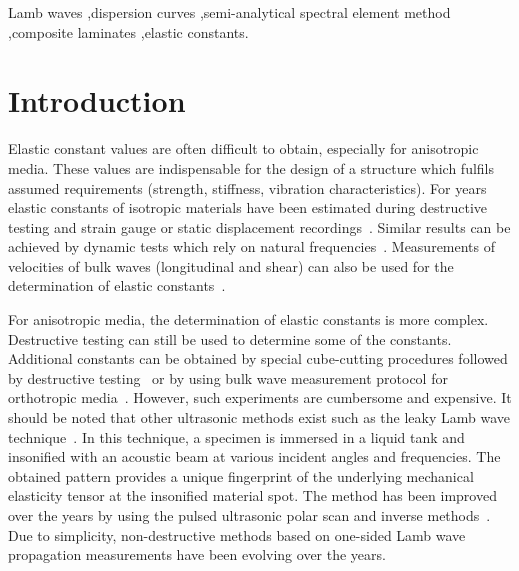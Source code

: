 \begin{frontmatter}
		\begin{keyword}
			Lamb waves \sep dispersion curves \sep semi-analytical spectral element method \sep composite laminates \sep elastic constants.
			
			
		\end{keyword}
		
	\end{frontmatter}
	
	
	
	
	
	
\section{Introduction}
	
	Elastic constant values are often difficult to obtain, especially for anisotropic media. These values are indispensable for the design of a structure which fulfils assumed requirements (strength, stiffness, vibration characteristics). For years elastic constants of isotropic materials have been estimated during destructive testing and strain gauge or static displacement recordings~\cite{Wang2000}. Similar results can be achieved by dynamic tests which rely on natural frequencies~\cite{Wang2000a, Wesolowski2009,Beluch2014}. Measurements of velocities of bulk waves (longitudinal and shear) can also be used for the determination of elastic constants~\cite{Rose1999}.
	
	For anisotropic media, the determination of elastic constants is more complex. Destructive testing can still be used to determine some of the constants. Additional constants can be obtained by special cube-cutting procedures followed by destructive testing~\cite{Rose1991} or by using bulk wave measurement protocol for orthotropic media~\cite{Rose1999}. However, such experiments are cumbersome and expensive.  It should be noted that other ultrasonic methods exist such as the leaky Lamb wave technique~\cite{Karim1990,Karim1990a}. In this technique, a specimen is immersed in a liquid tank and insonified with an acoustic beam at various incident angles and frequencies. The obtained pattern provides a unique fingerprint of the underlying mechanical elasticity tensor at the insonified material spot. The method has been improved over the years by using the pulsed ultrasonic polar scan and inverse methods~\cite{Kersemans2014,Martens2017}. Due to simplicity, non-destructive methods based on one-sided Lamb wave propagation measurements have been evolving over the years.
	
